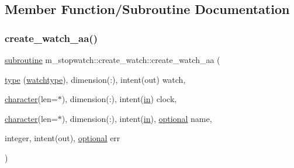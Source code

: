 \subsection{Member Function/\+Subroutine Documentation}
\mbox{\label{interfacem__stopwatch_1_1create__watch_a360c0d9583467f8239061dd6b891a744}} 
\subsubsection{\texorpdfstring{create\+\_\+watch\+\_\+aa()}{create\_watch\_aa()}}
{\footnotesize\ttfamily \hyperlink{M__stopwatch_83_8txt_acfbcff50169d691ff02d4a123ed70482}{subroutine} m\+\_\+stopwatch\+::create\+\_\+watch\+::create\+\_\+watch\+\_\+aa (\begin{DoxyParamCaption}\item[{\hyperlink{stop__watch_83_8txt_a70f0ead91c32e25323c03265aa302c1c}{type} (\hyperlink{structm__stopwatch_1_1watchtype}{watchtype}), dimension(\+:), intent(out)}]{watch,  }\item[{\hyperlink{option__stopwatch_83_8txt_abd4b21fbbd175834027b5224bfe97e66}{character}(len=$\ast$), dimension(\+:), intent(\hyperlink{M__journal_83_8txt_afce72651d1eed785a2132bee863b2f38}{in})}]{clock,  }\item[{\hyperlink{option__stopwatch_83_8txt_abd4b21fbbd175834027b5224bfe97e66}{character}(len=$\ast$), dimension(\+:), intent(\hyperlink{M__journal_83_8txt_afce72651d1eed785a2132bee863b2f38}{in}), \hyperlink{option__stopwatch_83_8txt_aa4ece75e7acf58a4843f70fe18c3ade5}{optional}}]{name,  }\item[{integer, intent(out), \hyperlink{option__stopwatch_83_8txt_aa4ece75e7acf58a4843f70fe18c3ade5}{optional}}]{err }\end{DoxyParamCaption})\hspace{0.3cm}{\ttfamily [private]}}

\mbox{\label{interfacem__stopwatch_1_1create__watch_a36f32fa4541cbc26afc54c6ec4fa91d4}} 
